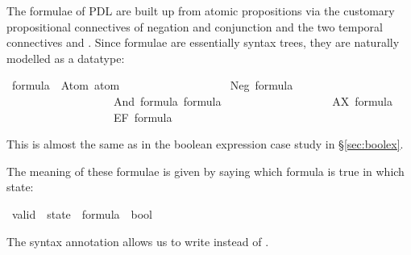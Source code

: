 %
\begin{isabellebody}%
\def\isabellecontext{PDL}%
%
%
\begin{isamarkuptext}%
The formulae of PDL are built up from atomic propositions via the customary
propositional connectives of negation and conjunction and the two temporal
connectives  and . Since formulae are essentially
syntax trees, they are naturally modelled as a datatype:%
\end{isamarkuptext}%
\ formula\ {\isacharequal}\ Atom\ atom\isanewline
\ \ \ \ \ \ \ \ \ \ \ \ \ \ \ \ \ \ {\isacharbar}\ Neg\ formula\isanewline
\ \ \ \ \ \ \ \ \ \ \ \ \ \ \ \ \ \ {\isacharbar}\ And\ formula\ formula\isanewline
\ \ \ \ \ \ \ \ \ \ \ \ \ \ \ \ \ \ {\isacharbar}\ AX\ formula\isanewline
\ \ \ \ \ \ \ \ \ \ \ \ \ \ \ \ \ \ {\isacharbar}\ EF\ formula%
\begin{isamarkuptext}%
\noindent
This is almost the same as in the boolean expression case study in
\S\ref{sec:boolex}.

The meaning of these formulae is given by saying which formula is true in
which state:%
\end{isamarkuptext}%
\ valid\ {\isacharcolon}{\isacharcolon}\ {\isachardoublequote}state\ {\isasymRightarrow}\ formula\ {\isasymRightarrow}\ bool{\isachardoublequote}\ \ \ {\isacharparenleft}{\isachardoublequote}{\isacharparenleft}{\isacharunderscore}\ {\isasymTurnstile}\ {\isacharunderscore}{\isacharparenright}{\isachardoublequote}\ {\isacharbrackleft}{}{}{\isacharcomma}{}{}{\isacharbrackright}\ {}{}{\isacharparenright}%
\begin{isamarkuptext}%
\noindent
The syntax annotation allows us to write  instead of
\hbox{}.


\end{isamarkuptext}
\end{isabellebody}
